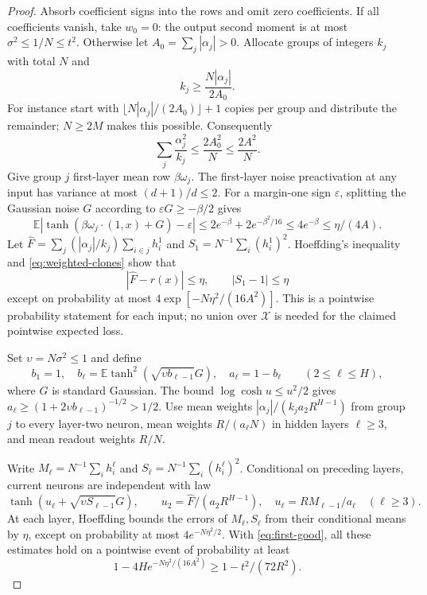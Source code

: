 \documentclass[11pt]{article}
\newcommand{\E}{\mathbb E}\newcommand{\Pp}{\mathbb P}\newcommand{\R}{\mathbb R}
\begin{document}
\begin{proof}
Absorb coefficient signs into the rows and omit zero coefficients. If all coefficients vanish, take $w_0=0$: the output second moment is at most $\sigma^2\le1/N\le t^2$. Otherwise let $A_0=\sum_j|\alpha_j|>0$. Allocate groups of integers $k_j$ with total $N$ and
\[
 k_j\ge\frac{N|\alpha_j|}{2A_0}.
\]
For instance start with $\lfloor N|\alpha_j|/(2A_0)\rfloor+1$ copies per group and distribute the remainder; $N\ge2M$ makes this possible. Consequently
\begin{equation}
 \sum_j\frac{\alpha_j^2}{k_j}\le\frac{2A_0^2}N\le\frac{2A^2}N.
 \label{eq:weighted-clones}
\end{equation}
Give group $j$ first-layer mean row $\beta\omega_j$. The first-layer noise preactivation at any input has variance at most $(d+1)/d\le2$. For a margin-one sign $\varepsilon$, splitting the Gaussian noise $G$ according to $\varepsilon G\ge-\beta/2$ gives
\[
 \E|\tanh(\beta\omega_j\cdot(1,x)+G)-\varepsilon|
 \le2e^{-\beta}+2e^{-\beta^2/16}\le4e^{-\beta}\le\eta/(4A).
\]
Let $\widehat F=\sum_j(|\alpha_j|/k_j)\sum_{i\in j}h_i^1$ and $S_1=N^{-1}\sum_i(h_i^1)^2$. Hoeffding's inequality and \eqref{eq:weighted-clones} show that
\begin{equation}
 |\widehat F-r(x)|\le\eta,\qquad |S_1-1|\le\eta
 \label{eq:first-good}
\end{equation}
except on probability at most $4\exp[-N\eta^2/(16A^2)]$. This is a pointwise probability statement for each input; no union over $\mathcal X$ is needed for the claimed pointwise expected loss.

Set $\upsilon=N\sigma^2\le1$ and define
\[
 b_1=1,\quad b_\ell=\E\tanh^2(\sqrt{\upsilon b_{\ell-1}}G),\quad a_\ell=1-b_\ell\qquad(2\le\ell\le H),
\]
where $G$ is standard Gaussian. The bound $\log\cosh u\le u^2/2$ gives
$a_\ell\ge(1+2\upsilon b_{\ell-1})^{-1/2}>1/2$.
Use mean weights $|\alpha_j|/(k_ja_2R^{H-1})$ from group $j$ to every layer-two neuron, mean weights $R/(a_\ell N)$ in hidden layers $\ell\ge3$, and mean readout weights $R/N$.

Write $M_\ell=N^{-1}\sum_i h_i^\ell$ and $S_\ell=N^{-1}\sum_i(h_i^\ell)^2$. Conditional on preceding layers, current neurons are independent with law
\[
 \tanh(u_\ell+\sqrt{\upsilon S_{\ell-1}}G),\qquad
 u_2=\widehat F/(a_2R^{H-1}),\quad u_\ell=RM_{\ell-1}/a_\ell\quad(\ell\ge3).
\]
At each layer, Hoeffding bounds the errors of $M_\ell,S_\ell$ from their conditional means by $\eta$, except on probability at most $4e^{-N\eta^2/2}$. With \eqref{eq:first-good}, all these estimates hold on a pointwise event of probability at least
\begin{equation}
 1-4H e^{-N\eta^2/(16A^2)}\ge1-t^2/(72R^2).
 \label{eq:good}
\end{equation}


\end{proof}
\end{document}
